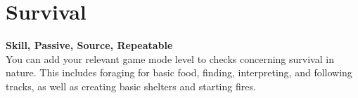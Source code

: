 \section{Survival}\label{sec:survival}
\textbf{Skill, Passive, Source, Repeatable}\\
You can add your relevant game mode level to checks concerning survival in nature.
This includes foraging for basic food, finding, interpreting, and following tracks, as well as creating basic shelters and starting fires.